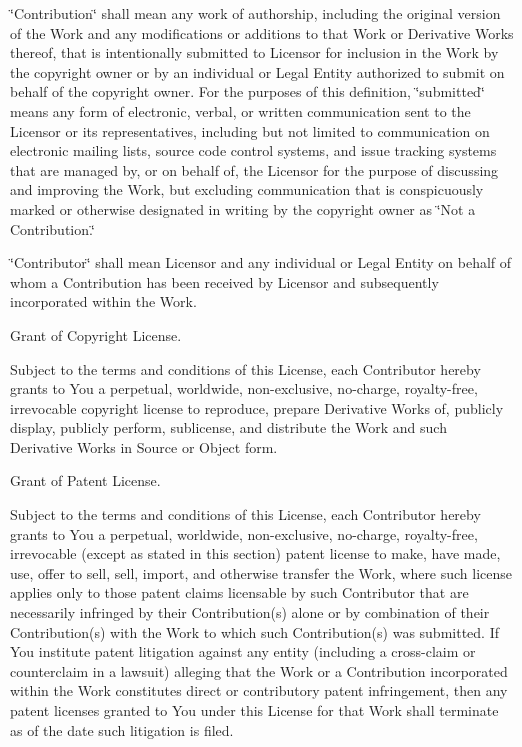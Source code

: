 \char`\"{}\+Contribution\char`\"{} shall mean any work of authorship, including the original version of the Work and any modifications or additions to that Work or Derivative Works thereof, that is intentionally submitted to Licensor for inclusion in the Work by the copyright owner or by an individual or Legal Entity authorized to submit on behalf of the copyright owner. For the purposes of this definition, \char`\"{}submitted\char`\"{} means any form of electronic, verbal, or written communication sent to the Licensor or its representatives, including but not limited to communication on electronic mailing lists, source code control systems, and issue tracking systems that are managed by, or on behalf of, the Licensor for the purpose of discussing and improving the Work, but excluding communication that is conspicuously marked or otherwise designated in writing by the copyright owner as \char`\"{}\+Not a Contribution.\char`\"{}

\char`\"{}\+Contributor\char`\"{} shall mean Licensor and any individual or Legal Entity on behalf of whom a Contribution has been received by Licensor and subsequently incorporated within the Work.


\begin{DoxyEnumerate}
\item Grant of Copyright License.
\end{DoxyEnumerate}

Subject to the terms and conditions of this License, each Contributor hereby grants to You a perpetual, worldwide, non-\/exclusive, no-\/charge, royalty-\/free, irrevocable copyright license to reproduce, prepare Derivative Works of, publicly display, publicly perform, sublicense, and distribute the Work and such Derivative Works in Source or Object form.


\begin{DoxyEnumerate}
\item Grant of Patent License.
\end{DoxyEnumerate}

Subject to the terms and conditions of this License, each Contributor hereby grants to You a perpetual, worldwide, non-\/exclusive, no-\/charge, royalty-\/free, irrevocable (except as stated in this section) patent license to make, have made, use, offer to sell, sell, import, and otherwise transfer the Work, where such license applies only to those patent claims licensable by such Contributor that are necessarily infringed by their Contribution(s) alone or by combination of their Contribution(s) with the Work to which such Contribution(s) was submitted. If You institute patent litigation against any entity (including a cross-\/claim or counterclaim in a lawsuit) alleging that the Work or a Contribution incorporated within the Work constitutes direct or contributory patent infringement, then any patent licenses granted to You under this License for that Work shall terminate as of the date such litigation is filed.


